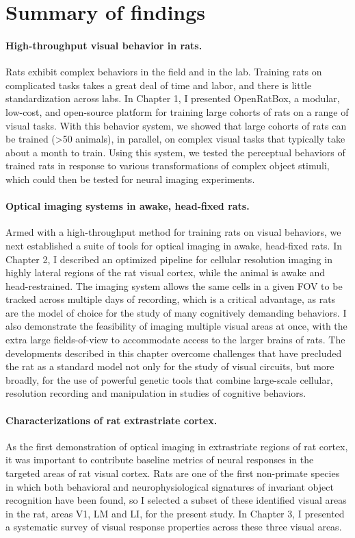 \section{Summary of findings} 
\paragraph{High-throughput visual behavior in rats.}  Rats exhibit complex behaviors in the field and in the lab. Training rats on complicated tasks takes a great deal of time and labor, and there is little standardization across labs. In Chapter 1, I presented OpenRatBox, a modular, low-cost, and open-source platform for training large cohorts of rats on a range of visual tasks. With this behavior system, we showed that large cohorts of rats can be trained (>50 animals), in parallel, on complex visual tasks that typically take about a month to train. Using this system, we tested the perceptual behaviors of trained rats in response to various transformations of complex object stimuli, which could then be tested for neural imaging experiments. 

\paragraph{Optical imaging systems in awake, head-fixed rats.}  Armed with a high-throughput method for training rats on visual behaviors, we next established a suite of tools for optical imaging in awake, head-fixed rats. In Chapter 2, I described an optimized pipeline for cellular resolution imaging in highly lateral regions of the rat visual cortex, while the animal is awake and head-restrained. The imaging system allows the same cells in a given FOV to be tracked across multiple days of recording, which is a critical advantage, as rats are the model of choice for the study of many cognitively demanding behaviors. I also demonstrate the feasibility of imaging multiple visual areas at once, with the extra large fields-of-view to accommodate access to the larger brains of rats. The developments described in this chapter overcome challenges that have precluded the rat as a standard model not only for the study of visual circuits, but more broadly, for the use of powerful genetic tools that combine large-scale cellular, resolution recording and manipulation in studies of cognitive behaviors.

\paragraph{Characterizations of rat extrastriate cortex.}  As the first demonstration of optical imaging in extrastriate regions of rat cortex, it was important to contribute baseline metrics of neural responses in the targeted areas of rat visual cortex. Rats are one of the first non-primate species in which both behavioral and neurophysiological signatures of invariant object recognition have been found, so I selected a subset of these identified visual areas in the rat, areas V1, LM and LI, for the present study. In Chapter 3, I presented a systematic survey of visual response properties across these three visual areas. 

